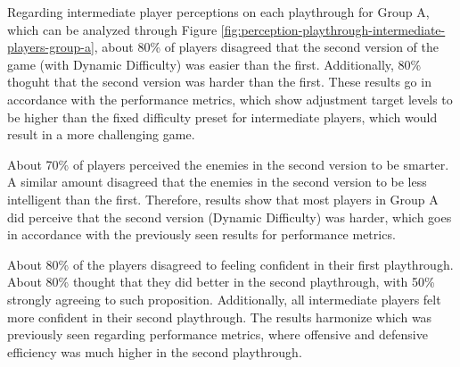 Regarding intermediate player perceptions on each playthrough for Group A, which can be analyzed through Figure \ref{fig:perception-playthrough-intermediate-players-group-a}, about 80\% of players disagreed that the second version of the game (with Dynamic Difficulty) was easier than the first. Additionally, 80\% thoguht that the second version was harder than the first. These results go in accordance with the performance metrics, which show adjustment target levels to be higher than the fixed difficulty preset for intermediate players, which would result in a more challenging game.

About 70\% of players perceived the enemies in the second version to be smarter. A similar amount disagreed that the enemies in the second version to be less intelligent than the first. Therefore, results show that most players in Group A did perceive that the second version (Dynamic Difficulty) was harder, which goes in accordance with the previously seen results for performance metrics.

About 80\% of the players disagreed to feeling confident in their first playthrough. About 80\% thought that they did better in the second playthrough, with 50\% strongly agreeing to such proposition. Additionally, all intermediate players felt more confident in their second playthrough. The results harmonize which was previously seen regarding performance metrics, where offensive and defensive efficiency was much higher in the second playthrough.

